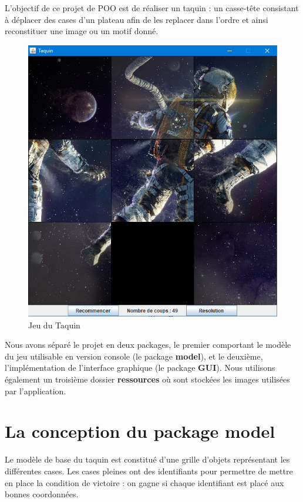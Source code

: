 \documentclass[a4paper,12pt]{article} %
\begin{document}
L'objectif de ce projet de POO est de réaliser un taquin : un casse-tête consistant à déplacer des cases d'un plateau afin de les replacer dans l'ordre et ainsi reconstituer une image ou un motif donné.

\begin{figure}[!h]
\centering
\includegraphics[scale=0.5]{images/Capture.PNG}
\caption{Jeu du Taquin}
\end{figure}

Nous avons séparé le projet en deux packages, le premier comportant le modèle du jeu utilisable en version console (le package \textbf{model}), et le deuxième, l'implémentation de l'interface graphique (le package \textbf{GUI}). Nous utilisons également un troisième dossier \textbf{ressources} où sont stockées les images utilisées par l'application.

\section{La conception du package model}

Le modèle de base du taquin est constitué d'une grille d'objets représentant les différentes cases. Les cases pleines ont des identifiants pour permettre de mettre en place la condition de victoire : on gagne si chaque identifiant est placé aux bonnes coordonnées.
\end{document}
